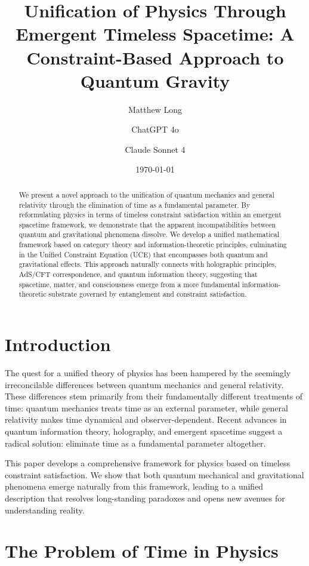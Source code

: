 \documentclass[12pt,a4paper]{article}
\title{Unification of Physics Through Emergent Timeless Spacetime: A Constraint-Based Approach to Quantum Gravity}
\author[1]{Matthew Long}
\author[2]{ChatGPT 4o}
\author[3]{Claude Sonnet 4}
\affil[1]{Yoneda AI}
\affil[2]{OpenAI}
\affil[3]{Anthropic}
\date{\today}
\begin{document}
\maketitle

\begin{abstract}
We present a novel approach to the unification of quantum mechanics and general relativity through the elimination of time as a fundamental parameter. By reformulating physics in terms of timeless constraint satisfaction within an emergent spacetime framework, we demonstrate that the apparent incompatibilities between quantum and gravitational phenomena dissolve. We develop a unified mathematical framework based on category theory and information-theoretic principles, culminating in the Unified Constraint Equation (UCE) that encompasses both quantum and gravitational effects. This approach naturally connects with holographic principles, AdS/CFT correspondence, and quantum information theory, suggesting that spacetime, matter, and consciousness emerge from a more fundamental information-theoretic substrate governed by entanglement and constraint satisfaction.
\end{abstract}

\onehalfspacing

\tableofcontents

\newpage

\section{Introduction}

The quest for a unified theory of physics has been hampered by the seemingly irreconcilable differences between quantum mechanics and general relativity. These differences stem primarily from their fundamentally different treatments of time: quantum mechanics treats time as an external parameter, while general relativity makes time dynamical and observer-dependent. Recent advances in quantum information theory, holography, and emergent spacetime suggest a radical solution: eliminate time as a fundamental parameter altogether.

This paper develops a comprehensive framework for physics based on timeless constraint satisfaction. We show that both quantum mechanical and gravitational phenomena emerge naturally from this framework, leading to a unified description that resolves long-standing paradoxes and opens new avenues for understanding reality.

\section{The Problem of Time in Physics}
\end{document}
